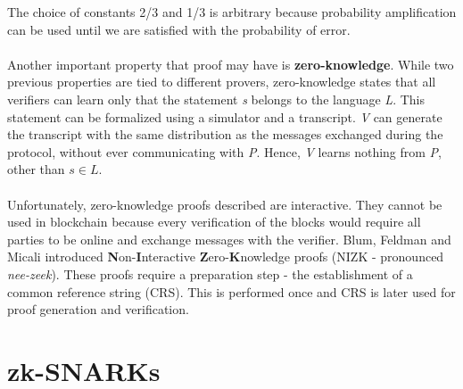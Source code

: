 The choice of constants 2/3 and 1/3 is arbitrary because probability amplification can be used until we are satisfied with the probability of error.\\
\\
Another important property that proof may have is \textbf{zero-knowledge}. While two previous properties are tied to different provers, zero-knowledge states that all verifiers can learn only that the statement \textit{s} belongs to the language \textit{L}. This statement can be formalized using a simulator and a transcript. \textit{V} can generate the transcript with the same distribution as the messages exchanged during the protocol, without ever communicating with \textit{P}. Hence, \textit{V} learns nothing from \textit{P}, other than $s \in L$.\\
\\
Unfortunately, zero-knowledge proofs described are interactive. They cannot be used in blockchain because every verification of the blocks would require all parties to be online and exchange messages with the verifier. Blum, Feldman and Micali \cite{blum1988non} introduced \textbf{N}on-\textbf{I}nteractive \textbf{Z}ero-\textbf{K}nowledge proofs (NIZK - pronounced \textit{nee-zeek}). These proofs require a preparation step - the establishment of a common reference string (CRS). This is performed once and CRS is later used for proof generation and verification.

\section{zk-SNARKs}

